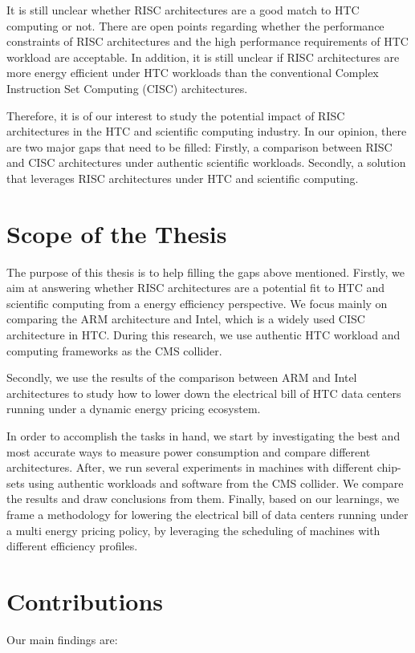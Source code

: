 It is still unclear whether RISC architectures are a good match to HTC
computing or not. There are open points regarding whether the performance 
constraints of RISC architectures and the high performance requirements of HTC 
workload are acceptable. In addition, it is still unclear if RISC architectures
are more energy efficient under HTC workloads than the conventional Complex 
Instruction Set Computing (CISC) architectures.

Therefore, it is of our interest to study the potential impact of RISC architectures in 
the HTC and scientific computing industry. In our opinion, there are two major
gaps that need to be filled: Firstly, a comparison between
RISC and CISC architectures under authentic scientific workloads. Secondly,
a solution that leverages RISC architectures under HTC and scientific
computing.
 

\section{Scope of the Thesis}
The purpose of this thesis is to help filling the gaps above mentioned. Firstly, we aim at answering whether RISC architectures
are a potential fit to HTC and scientific computing from a energy efficiency
perspective. We focus mainly on comparing the ARM architecture and Intel, which is a widely used CISC architecture in HTC. During this research, we
use authentic HTC workload and computing frameworks as the CMS collider. 

Secondly, we use the results of the comparison between ARM and Intel architectures to study how to lower down the electrical bill of HTC data centers running under a dynamic energy
pricing ecosystem.


In order to accomplish the tasks in hand, we start by investigating the best
and most accurate ways to measure power consumption and compare different
architectures. After, we run several experiments in machines with different chip-sets using
authentic workloads and software from the CMS collider. We compare the results and
draw conclusions from them. Finally, based on our learnings, we frame a methodology for
lowering the electrical bill of data centers running under a multi energy
pricing policy, by leveraging the scheduling of machines with different
efficiency profiles.  

   
\section{Contributions}
Our main findings are: 

